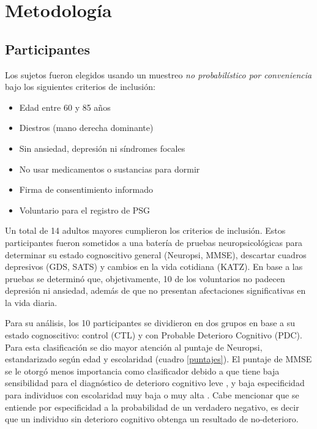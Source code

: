 
\chapter{Metodología}

\section{Participantes}

Los sujetos fueron elegidos usando un muestreo \textit{no probabilístico por conveniencia} bajo los 
siguientes criterios de inclusión:
\begin{itemize}
\item Edad entre 60 y 85 años
\item Diestros (mano derecha dominante)
\item Sin ansiedad, depresión ni síndromes focales
\item No usar medicamentos o sustancias para dormir
\item Firma de consentimiento informado
\item Voluntario para el registro de PSG
\end{itemize}

Un total de 14 adultos mayores cumplieron los criterios de inclusión. Estos participantes fueron 
sometidos a una batería de pruebas neuropsicológicas para determinar su estado cognoscitivo general 
(Neuropsi, MMSE), descartar cuadros depresivos (GDS, SATS) y cambios en la vida cotidiana (KATZ).
%
En base a las pruebas se determinó que, objetivamente, 10 de los voluntarios no padecen depresión ni 
ansiedad, además de que no presentan afectaciones significativas en la vida diaria.

Para su análisis, los 10 participantes se dividieron en dos grupos en base a su estado cognoscitivo:
control (CTL) y con Probable Deterioro Cognitivo (PDC). 
%
Para esta clasificación se dio mayor atención al puntaje de Neuropsi, estandarizado según edad y 
escolaridad (cuadro \ref{puntajes}). 
%
El puntaje de MMSE se le otorgó menos importancia como clasificador debido a que tiene baja 
sensibilidad para el diagnóstico de deterioro cognitivo leve \cite{Ardila12}, y baja especificidad 
para individuos con escolaridad muy baja o muy alta \cite{Ostrosky00}.
%
Cabe mencionar que se entiende por especificidad a la probabilidad de un verdadero negativo, es 
decir que un individuo sin deterioro cognitivo obtenga un resultado de no-deterioro.

